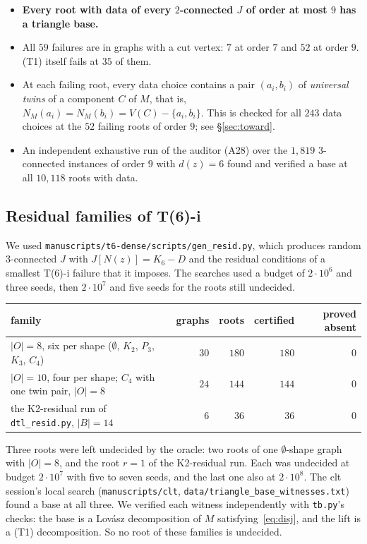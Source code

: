 \documentclass[11pt]{amsart}
\theoremstyle{definition}
\newcommand{\RESIDA}{$180$}
\newcommand{\RESIDK}{$36$}
\begin{document}
\begin{itemize}[leftmargin=*]
\item \textbf{Every root with data of every $2$-connected $J$ of order at most $9$ has a triangle
base.}
\item All $59$ failures are in graphs with a cut vertex: $7$ at order $7$ and $52$ at order $9$. (T1)
itself fails at $35$ of them.
\item At each failing root, every data choice contains a pair $(a_i,b_i)$ of \emph{universal twins} of
a component $C$ of $M$, that is, $N_M(a_i)=N_M(b_i)=V(C)-\{a_i,b_i\}$. This is checked for all $243$
data choices at the $52$ failing roots of order $9$; see \S\ref{sec:toward}.
\item An independent exhaustive run of the auditor (A28) over the $1{,}819$ $3$-connected instances of
order $9$ with $d(z)=6$ found and verified a base at all $10{,}118$ roots with data.
\end{itemize}

\subsection{Residual families of T(6)-i}
We used \texttt{manuscripts/t6-dense/scripts/gen\_resid.py}, which produces random $3$-connected $J$
with $J[N(z)]=K_6-D$ and the residual conditions of a smallest T(6)-i failure that it imposes. The
searches used a budget of $2\cdot10^6$ and three seeds, then $2\cdot10^7$ and five seeds for the
roots still undecided.

\begin{center}
\begin{tabular}{lrrrr}
\toprule
family & graphs & roots & certified & proved absent\\
\midrule
$|O|=8$, six per shape ($\emptyset$, $K_2$, $P_3$, $K_3$, $C_4$) & $30$ & $180$ & \RESIDA & $0$\\
$|O|=10$, four per shape; $C_4$ with one twin pair, $|O|=8$ & $24$ & $144$ & $144$ & $0$\\
the K2-residual run of \texttt{dtl\_resid.py}, $|B|=14$ & $6$ & $36$ & \RESIDK & $0$\\
\bottomrule
\end{tabular}
\end{center}
Three roots were left undecided by the oracle: two roots of one $\emptyset$-shape graph with $|O|=8$,
and the root $r=1$ of the K2-residual run. Each was undecided at budget $2\cdot10^7$ with five to
seven seeds, and the last one also at $2\cdot10^8$. The clt session's local search
(\texttt{manuscripts/clt}, \texttt{data/triangle\_base\_witnesses.txt}) found a base at all three.
We verified each witness independently with \texttt{tb.py}'s checks: the base is a Lov\'asz
decomposition of $M$ satisfying~\eqref{eq:disj}, and the lift is a (T1) decomposition. So no root
of these families is undecided.
\end{document}

